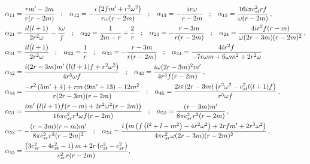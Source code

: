 \documentclass[11pt]{article}
\begin{document}
\begin{align} \label{alpha_vals}
\alpha_{11}&=\frac{r m'-2 m}{r (r-2 m)} \hspace{3mm} ; \hspace{3mm}
\alpha_{12}=-\frac{i \left(2 f m'+r^2 \omega ^2\right)}{r \omega  (r-2 m)} \hspace{3mm} ; \hspace{3mm}
\alpha_{13}=-\frac{i r \omega }{r-2 m} \hspace{3mm} ; \hspace{3mm}
\alpha_{15}= \frac{16 i \pi  c_{st}^2 r f}{\omega(r -2 m)}\,, \nonumber\\
\alpha_{21}&=\frac{i l (l+1)}{2 r^2 \omega }-\frac{i \omega }{f} \hspace{3mm} ; \hspace{3mm}
\alpha_{22}=\frac{1}{2 m-r}+\frac{2}{r} \hspace{3mm} ; \hspace{3mm}
\alpha_{23}=-\frac{r-3 m}{r(r-2 m)} \hspace{3mm} ; \hspace{3mm} 
\alpha_{24}=\frac{4 i r^2 f (r-m)}{\omega  (2 r-3 m) (r-2 m)^2}\,, \nonumber\\
\alpha_{31}&=\frac{i l (l+1)}{2 r^2 \omega } \hspace{3mm} ; \hspace{3mm} \alpha_{32}=\frac{1}{r} \hspace{3mm} ; \hspace{3mm}
\alpha_{33}=-\frac{r-3 m}{r(r-2 m)} \hspace{3mm} ; \hspace{3mm}
\alpha_{34}=\frac{4 i r^2 f}{-7 r \omega  m+6 \omega  m^2+2 r^2 \omega } \nonumber\\
\alpha_{42}&=\frac{i (2 r-3 m) m'\left(l (l+1) f+r^2 \omega ^2\right)}{4 r^5 \omega  f} \hspace{3mm} ; \hspace{3mm}
\alpha_{43}=\frac{i \omega  (2 r-3 m)^2 m'}{4 r^3 f (r-2 m)}\,, \nonumber \\
\alpha_{44}&=\frac{-r^2 \left(5 m'+4\right)+r m \left(9 m'+13\right)-12 m^2}{r (2 r-3 m) (r-2 m)} \hspace{3mm} ; \hspace{3mm}
\alpha_{45}=\frac{2 i \pi  (2 r-3 m) \left(r^2 \omega ^2-c_{st}^2 l (l+1) f\right)}{r^3 \omega  f}\,, \nonumber \\ 
\alpha_{51}&=\frac{i m' \left(l (l+1) f (r-m)+2 r^2 \omega ^2 (r-2 m)\right)}{16 \pi  c_{sr}^2 r^4 \omega  f (r-2 m)} \hspace{3mm} ; \hspace{3mm} \alpha_{52}=\frac{(r-3 m) m'}{8 \pi  c_{sr}^2 r^3 (r-2 m)}\,, \nonumber\\
\alpha_{53}&=-\frac{(r-3 m) (r-m) m'}{8 \pi  c_{sr}^2 r^3 (r-2 m)^2} \hspace{3mm} ; \hspace{3mm}
\alpha_{54}=\frac{i \left(m \left(f \left(l^2+l-m^2\right)-4 r^2 \omega ^2\right)+2 r f m'+2 r^3 \omega ^2\right)}{4 \pi  c_{sr}^2 \omega  (2 r-3 m) (r-2 m)^2}\,, \nonumber\\
\alpha_{55}&=\frac{\left(3 c_{sr}^2-4 c_{st}^2-1\right) m+2 r \left(c_{st}^2-c_{sr}^2\right)}{c_{sr}^2 r (r-2 m)}, 
\end{align}
\end{document}
